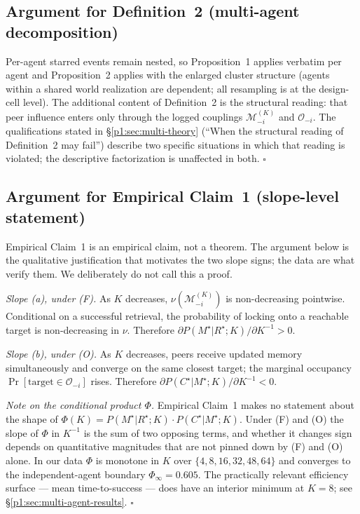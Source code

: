 \documentclass{article}
\begin{document}
\subsection{Argument for Definition~2 (multi-agent decomposition)}

Per-agent starred events remain nested, so Proposition~1 applies verbatim per agent and Proposition~2 applies with the enlarged cluster structure (agents within a shared world realization are dependent; all resampling is at the design-cell level). The additional content of Definition~2 is the structural reading: that peer influence enters only through the logged couplings $\mathcal{M}_{-i}^{(K)}$ and $\mathcal{O}_{-i}$. The qualifications stated in \S\ref{p1:sec:multi-theory} (``When the structural reading of Definition~2 may fail'') describe two specific situations in which that reading is violated; the descriptive factorization is unaffected in both. \hfill$\square$

\subsection{Argument for Empirical Claim~1 (slope-level statement)}

Empirical Claim~1 is an empirical claim, not a theorem. The argument below is the qualitative justification that motivates the two slope signs; the data are what verify them. We deliberately do not call this a proof.

\emph{Slope (a), under (F).} As $K$ decreases, $\nu(\mathcal{M}_{-i}^{(K)})$ is non-decreasing pointwise. Conditional on a successful retrieval, the probability of locking onto a reachable target is non-decreasing in $\nu$. Therefore $\partial P(M^\star|R^\star;K) / \partial K^{-1} > 0$.

\emph{Slope (b), under (O).} As $K$ decreases, peers receive updated memory simultaneously and converge on the same closest target; the marginal occupancy $\Pr[\text{target}\in\mathcal{O}_{-i}]$ rises. Therefore $\partial P(C^\star|M^\star;K) / \partial K^{-1} < 0$.

\emph{Note on the conditional product $\Phi$.} Empirical Claim~1 makes no statement about the shape of $\Phi(K) = P(M^\star|R^\star;K)\!\cdot\!P(C^\star|M^\star;K)$. Under (F) and (O) the slope of $\Phi$ in $K^{-1}$ is the sum of two opposing terms, and whether it changes sign depends on quantitative magnitudes that are not pinned down by (F) and (O) alone. In our data $\Phi$ is monotone in $K$ over $\{4,8,16,32,48,64\}$ and converges to the independent-agent boundary $\Phi_\infty = 0.605$. The practically relevant efficiency surface --- mean time-to-success --- does have an interior minimum at $K=8$; see \S\ref{p1:sec:multi-agent-results}. \hfill$\square$
\end{document}
